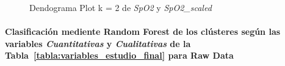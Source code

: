 \begin{figure}[ht]
    \centering
    \hfill
    \caption{Dendograma Plot k = 2 de \textit{SpO2} y \textit{SpO2\_scaled}}\label{fig:raw_data_ctg_spo2}
\end{figure}

\paragraph{Clasificación mediente Random Forest de los clústeres según las variables \textit{Cuantitativas} y \textit{Cualitativas} de la Tabla~\ref{tabla:variables_estudio_final} para Raw Data}

